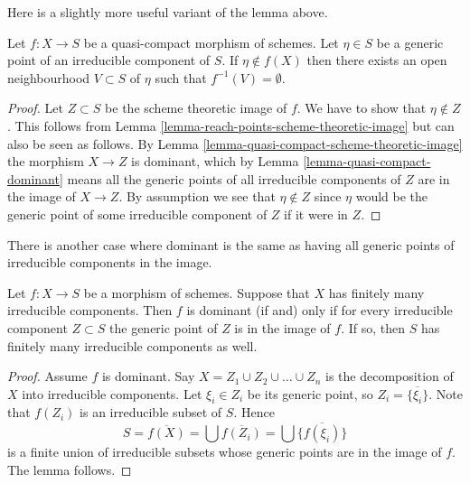 \noindent
Here is a slightly more useful variant of the lemma above.

\begin{lemma}
\label{lemma-quasi-compact-generic-point-not-in-image}
Let $f : X \to S$ be a quasi-compact morphism of schemes.
Let $\eta \in S$ be a generic point of an irreducible
component of $S$. If $\eta \not \in f(X)$ then there
exists an open neighbourhood $V \subset S$ of $\eta$
such that $f^{-1}(V) = \emptyset$.
\end{lemma}

\begin{proof}
Let $Z \subset S$ be the scheme theoretic image of $f$.
We have to show that $\eta \not \in Z$.
This follows from
Lemma \ref{lemma-reach-points-scheme-theoretic-image}
but can also be seen as follows.
By Lemma \ref{lemma-quasi-compact-scheme-theoretic-image}
the morphism $X \to Z$ is dominant, which by
Lemma \ref{lemma-quasi-compact-dominant}
means all the generic points of all irreducible components of $Z$
are in the image of $X \to Z$. By assumption we see that
$\eta \not \in Z$ since $\eta$ would be the generic
point of some irreducible component of $Z$ if it were in $Z$.
\end{proof}

\noindent
There is another case where dominant is the same as having all
generic points of irreducible components in the image.

\begin{lemma}
\label{lemma-dominant-finite-number-irreducible-components}
Let $f : X \to S$ be a morphism of schemes.
Suppose that $X$ has finitely many irreducible components.
Then $f$ is dominant (if and) only if for every irreducible
component $Z \subset S$ the generic point of $Z$ is in the
image of $f$. If so, then $S$ has finitely many irreducible
components as well.
\end{lemma}

\begin{proof}
Assume $f$ is dominant.
Say $X = Z_1 \cup Z_2 \cup \ldots \cup Z_n$ is the decomposition
of $X$ into irreducible components. Let $\xi_i \in Z_i$ be
its generic point, so $Z_i = \overline{\{\xi_i\}}$.
Note that $f(Z_i)$ is an irreducible subset of $S$.
Hence
$$
S = \overline{f(X)} = \bigcup \overline{f(Z_i)} =
\bigcup \overline{\{f(\xi_i)\}}
$$
is a finite union of irreducible subsets whose generic
points are in the image of $f$. The lemma follows.
\end{proof}

